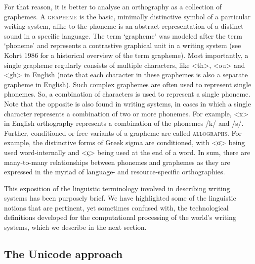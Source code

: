 {{{{{{{{{{For that reason, it is better to analyse an orthography as a collection of graphemes. A \textsc{grapheme} is the basic, minimally distinctive symbol of a particular writing system, alike to the phoneme is an abstract representation of a distinct sound in a specific language. The term `grapheme' was modeled after the term `phoneme' and represents a contrastive graphical unit in a writing system (see Kohrt 1986 for a historical overview of the term grapheme). Most importantly, a single grapheme regularly consists of multiple characters, like <th>, <ou> and <gh> in English (note that each character in these graphemes is also a separate grapheme in English). Such complex graphemes are often used to represent single phonemes. So, a combination of characters is used to represent a single phoneme. Note that the opposite is also found in writing systems, in cases in which a single character represents a combination of two or more phonemes. For example, <x> in English orthography represents a combination of the phonemes /k/ and /s/. Further, conditioned or free variants of a grapheme are called \textsc{allographs}. For example, the distinctive forms of Greek sigma are conditioned, with <σ> being used word-internally and <ς> being used at the end of a word. In sum, there are many-to-many relationships between phonemes and graphemes as they are expressed in the myriad of language- and resource-specific orthographies.

This exposition of the linguistic terminology involved in describing writing systems has been purposely brief. We have highlighted some of the linguistic notions that are pertinent, yet sometimes confused with, the technological definitions developed for the computational processing of the world's writing systems, which we describe in the next section.

\subsection{The Unicode approach}\label{the-unicode-approach}

}}}}}}}}}}
